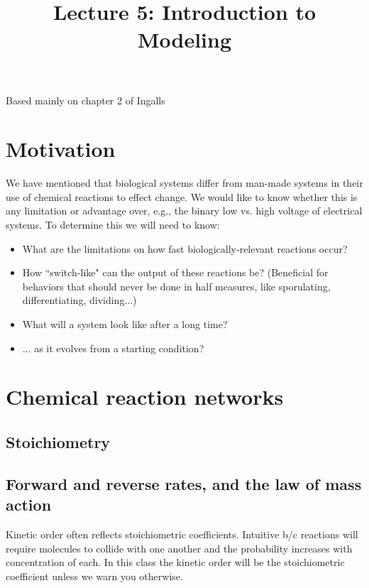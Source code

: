 \documentclass{article}
\begin{document}
\large

\title{Lecture 5: Introduction to Modeling}
\maketitle




Based mainly on chapter 2 of Ingalls

\section*{Motivation}

We have mentioned that biological systems differ from man-made systems in their use of chemical reactions to effect change. We would like to know whether this is any limitation or advantage over, e.g., the binary low vs. high voltage of electrical systems. To determine this we will need to know:

\begin{itemize}
\item What are the limitations on how fast biologically-relevant reactions occur?
\item How ``switch-like" can the output of these reactions be? (Beneficial for behaviors that should never be done in half measures, like sporulating, differentiating, dividing...)
\item What will a system look like after a long time?
\item $\ldots$ as it evolves from a starting condition?
\end{itemize}

\section*{Chemical reaction networks}

\subsection*{Stoichiometry}

\subsection*{Forward and reverse rates, and the law of mass action}

Kinetic order often reflects stoichiometric coefficients. Intuitive b/c reactions will require molecules to collide with one another and the probability increases with concentration of each. In this class the kinetic order will be the stoichiometric coefficient unless we warn you otherwise.\\
\end{document}
